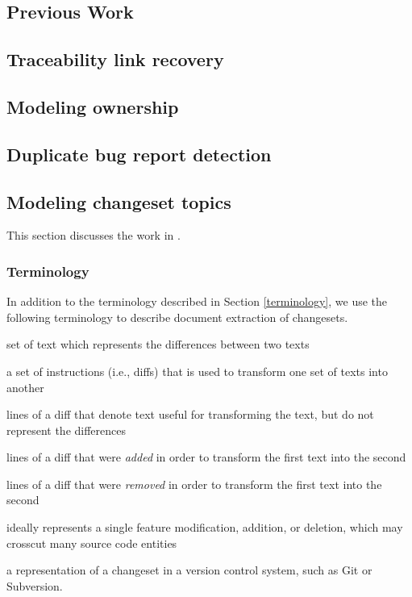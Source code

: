 \documentclass[12pt,draft]{Manuscript}
\begin{document}
\begin{body}
\chapter{Previous Work}\label{previous-work}

\section{Traceability link recovery}\label{tefse2011}

\section{Modeling ownership}\label{icpc2012}

\section{Duplicate bug report detection}\label{msr2013}

\section{Modeling changeset topics}\label{mud2014}

This section discusses the work in \citet{Corley-etal:2014}.

\subsection{Terminology}\label{terminology-2}

In addition to the terminology described in Section \ref{terminology},
we use the following terminology to describe document extraction of
changesets.

\begin{description}
\itemsep1pt\parskip0pt
\item[diff:]
set of text which represents the differences between two texts
\item[patch:]
a set of instructions (i.e., diffs) that is used to transform one set of
texts into another
\item[context lines:]
lines of a diff that denote text useful for transforming the text, but
do not represent the differences
\item[added lines:]
lines of a diff that were \emph{added} in order to transform the first
text into the second
\item[removed lines:]
lines of a diff that were \emph{removed} in order to transform the first
text into the second
\item[changeset]
ideally represents a single feature modification, addition, or deletion,
which may crosscut many source code entities
\item[commit]
a representation of a changeset in a version control system, such as Git
or Subversion.
\end{description}


\end{body}
\end{document}
